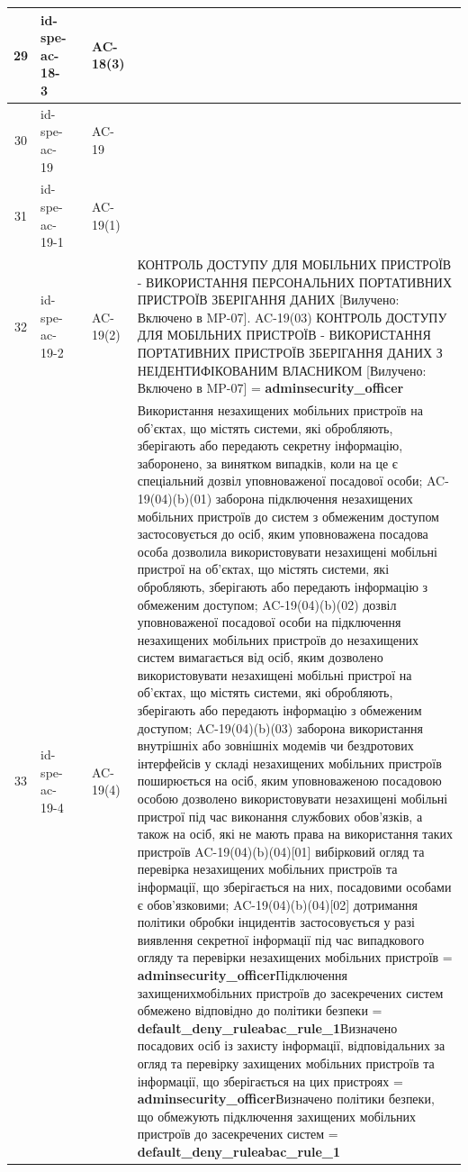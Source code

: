 \documentclass[10pt]{article}
\begin{document}
\begin{longtable}{|c|>{\raggedright\arraybackslash}p{4cm}|>{\raggedright\arraybackslash}p{2.5cm}|>{\raggedright\arraybackslash}p{3.5cm}|>{\raggedright\arraybackslash}p{5.5cm}|}
29 & id-spe-ac-18-3 &  & AC-18(3) &  \\ \hline
30 & id-spe-ac-19 &  & AC-19 &  \\ \hline
31 & id-spe-ac-19-1 &  & AC-19(1) &  \\ \hline
32 & id-spe-ac-19-2 &  & AC-19(2) & КОНТРОЛЬ ДОСТУПУ ДЛЯ МОБІЛЬНИХ ПРИСТРОЇВ - ВИКОРИСТАННЯ ПЕРСОНАЛЬНИХ ПОРТАТИВНИХ ПРИСТРОЇВ ЗБЕРІГАННЯ ДАНИХ [Вилучено: Включено в MP-07]. AC-19(03) КОНТРОЛЬ ДОСТУПУ ДЛЯ МОБІЛЬНИХ ПРИСТРОЇВ - ВИКОРИСТАННЯ ПОРТАТИВНИХ ПРИСТРОЇВ ЗБЕРІГАННЯ ДАНИХ З НЕІДЕНТИФІКОВАНИМ ВЛАСНИКОМ [Вилучено: Включено в MP-07] = \textbf{adminsecurity\_\allowbreak{}officer} \\ \hline
33 & id-spe-ac-19-4 &  & AC-19(4) & Використання незахищених мобільних пристроїв на об'єктах, що містять системи, які обробляють, зберігають або передають секретну інформацію, заборонено, за винятком випадків, коли на це є спеціальний дозвіл уповноваженої посадової особи; AC-19(04)(b)(01) заборона підключення незахищених мобільних пристроїв до систем з обмеженим доступом застосовується до осіб, яким уповноважена посадова особа дозволила використовувати незахищені мобільні пристрої на об'єктах, що містять системи, які обробляють, зберігають або передають інформацію з обмеженим доступом; AC-19(04)(b)(02) дозвіл уповноваженої посадової особи на підключення незахищених мобільних пристроїв до незахищених систем вимагається від осіб, яким дозволено використовувати незахищені мобільні пристрої на об'єктах, що містять системи, які обробляють, зберігають або передають інформацію з обмеженим доступом; AC-19(04)(b)(03) заборона використання внутрішніх або зовнішніх модемів чи бездротових інтерфейсів у складі незахищених мобільних пристроїв поширюється на осіб, яким уповноваженою посадовою особою дозволено використовувати незахищені мобільні пристрої під час виконання службових обов'язків, а також на осіб, які не мають права на використання таких пристроїв AC-19(04)(b)(04)[01] вибірковий огляд та перевірка незахищених мобільних пристроїв та інформації, що зберігається на них, посадовими особами є обов'язковими; AC-19(04)(b)(04)[02] дотримання політики обробки інцидентів застосовується у разі виявлення секретної інформації під час випадкового огляду та перевірки незахищених мобільних пристроїв = \textbf{adminsecurity\_\allowbreak{}officer}\newline Підключення захищенихмобільних пристроїв до засекречених систем обмежено відповідно до політики безпеки = \textbf{default\_\allowbreak{}deny\_\allowbreak{}ruleabac\_\allowbreak{}rule\_\allowbreak{}1}\newline Визначено посадових осіб із захисту інформації, відповідальних за огляд та перевірку захищених мобільних пристроїв та інформації, що зберігається на цих пристроях = \textbf{adminsecurity\_\allowbreak{}officer}\newline Визначено політики безпеки, що обмежують підключення захищених мобільних пристроїв до засекречених систем = \textbf{default\_\allowbreak{}deny\_\allowbreak{}ruleabac\_\allowbreak{}rule\_\allowbreak{}1} \\ \hline

\end{longtable}
\end{document}
